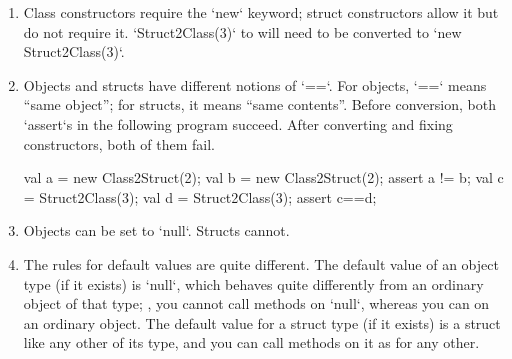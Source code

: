 \begin{enumerate}

\item Class constructors require the \xcd`new` keyword; struct constructors
      allow  it but do not require it.  
      \xcd`Struct2Class(3)` to will need to be converted to 
      \xcd`new Struct2Class(3)`.

\item Objects and structs have different notions of \xcd`==`.  
      For objects, \xcd`==` means ``same object''; for structs, it means
      ``same contents''. Before conversion, both \xcd`assert`s in the
      following program succeed.  After converting and fixing constructors,
      both of them fail.
\begin{xten}
val a = new Class2Struct(2);
val b = new Class2Struct(2);
assert a != b;
val c = Struct2Class(3);
val d = Struct2Class(3);
assert c==d;
\end{xten}

\item Objects can be set to \xcd`null`.  Structs cannot.  

\item The rules for default values are quite different.  
The default value of an object type (if it exists) is \xcd`null`, which behaves quite
differently from an ordinary object of that type; \eg, you cannot call methods
on \xcd`null`, whereas you can on an ordinary object. The default value for
a struct type (if it exists) is a struct like any other of its type, and you
can call methods on it as for any other.


\end{enumerate}
